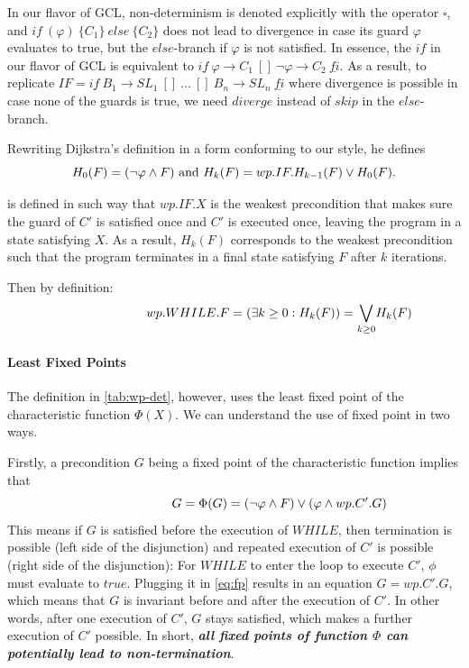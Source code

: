 In our flavor of GCL, non-determinism is denoted explicitly with the operator $\square$, and $if\ (\varphi)\ \{C_1\}\ else\ \{C_2\}$ does not lead to divergence in case its guard $\varphi$ evaluates to true, but the $else$-branch if $\varphi$ is not satisfied. 
In essence, the $if$ in our flavor of GCL is equivalent to $\underline{if}\ \varphi \to C_1\ []\ \neg \varphi\to C_2\ \underline{fi}$. 
As a result, to replicate $IF=\underline{if}\ B_1 \to SL_1 \ []\ \dots\ []\ B_n\to SL_n\ \underline{fi}$ where divergence is possible in case none of the guards is true, we need $diverge$ instead of $skip$ in the $else$-branch. 

Rewriting Dijkstra's definition in a form conforming to our style, he defines 
\[
H_0(F)=( \neg \varphi\wedge F )
\\\text{ and } \\ 
H_k(F)=wp.IF.H_{k-1}(F) \vee H_0(F). 
\]

 is defined in such way that $wp.IF.X$ is the weakest precondition that makes sure the guard of $C'$ is satisfied once and $C'$ is executed once, leaving the program in a state satisfying $X$.
As a result, $H_k(F)$ corresponds to the weakest precondition such that the program terminates in a final state satisfying $F$ after  $k$ iterations.



Then by definition: 
\begin{equation}
  \hspace{2.5cm}
  wp.WHILE.F=(\exists k\geq 0: H_k(F)) = \underset{k\geq 0}{\bigvee} H_k(F) \label{eq:while}
\end{equation}

\paragraph{Least Fixed Points}
The definition in \autoref{tab:wp-det}, however, uses the least fixed point of the characteristic function $\Phi(X)$. 
We can understand the use of fixed point in two ways. 

Firstly, a precondition $G$ being a fixed point of the characteristic function implies that 
\begin{equation}
  \hspace{2.5cm}
  G= \Phi(G)=(\neg\varphi\wedge F)\vee(\varphi\wedge wp.C'.G) \label{eq:fp}
\end{equation}
This means if $G$ is satisfied before the execution of $WHILE$, then termination is possible (left side of the disjunction) and repeated execution of $C'$ is possible (right side of the disjunction):
For $WHILE$ to enter the loop to execute $C'$, $\phi$ must evaluate to $true$.
Plugging it in \autoref{eq:fp} results in an equation $G=wp.C'.G$, which means that $G$ is invariant before and after the execution of $C'$. 
In other words, after one execution of $C'$, $G$ stays satisfied, which makes a further execution of $C'$ possible.
In short, \textbf{\textit{all fixed points of function $\Phi$ can potentially lead to non-termination}}. 

